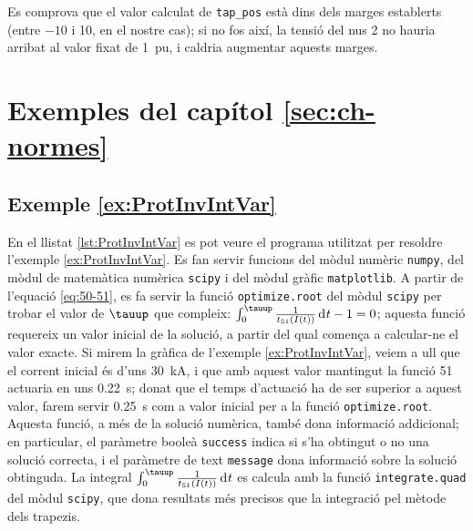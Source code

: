 Es comprova que el valor calculat de \texttt{tap\_pos} està dins dels marges establerts (entre $-10$ i 10, en el nostre cas); si no fos així, la tensió del nus 2 no hauria arribat al valor fixat de \qty{1}{pu}, i caldria augmentar aquests marges.


\section{Exemples del capítol \ref*{sec:ch-normes}}

\hypertarget{exemple:ProtInvIntVar}{\subsection{Exemple \ref*{ex:ProtInvIntVar} \ProtInvIntVar}}
En el llistat \vref{lst:ProtInvIntVar} es pot veure el programa utilitzat per resoldre l'exemple \vref{ex:ProtInvIntVar}. Es fan servir funcions  del mòdul numèric \texttt{numpy}, del mòdul de matemàtica numèrica \texttt{scipy} i del mòdul gràfic \texttt{matplotlib}. A partir de l'equació \eqref{eq:50-51}, es fa servir la funció  \texttt{optimize.root} del mòdul \texttt{scipy} per trobar el valor de $\tauup$ que compleix: $\int_0^\tauup \frac{1}{t_{51}(I(t))}  \diff t - 1 = 0$; aquesta  funció requereix un valor inicial de la solució, a partir del qual comença a calcular-ne el valor exacte. Si mirem la gràfica de l'exemple \ref{ex:ProtInvIntVar}, veiem a ull que el corrent inicial és d'uns \qty{30}{kA}, i que amb aquest valor mantingut la funció 51 actuaria en uns \qty{0,22}{s}; donat que el temps d'actuació ha de ser superior a aquest valor, farem servir \qty{0,25}{s} com a valor inicial per a la funció \texttt{optimize.root}. Aquesta funció, a més de la solució numèrica, també  dona informació addicional; en particular, el paràmetre booleà \texttt{success} indica si s'ha obtingut o no una solució correcta, i el  paràmetre de text \texttt{message}  dona informació sobre la solució obtinguda. La integral $\int_0^\tauup \frac{1}{t_{51}(I(t))}  \diff t$ es calcula amb la funció \texttt{integrate.quad} del mòdul \texttt{scipy}, que dona resultats més precisos que la integració pel mètode dels trapezis. 


